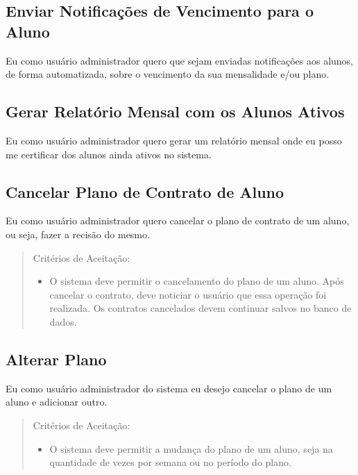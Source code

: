 \subsection[Enviar Notificações de Vencimento para o Aluno]{Enviar Notificações de Vencimento para o Aluno}
Eu como usuário administrador quero que sejam enviadas notificações aos alunos,
de forma automatizada, sobre o vencimento da sua mensalidade e/ou plano.

\subsection[Gerar Relatório Mensal com os Alunos Ativos]{Gerar Relatório Mensal com os Alunos Ativos}
Eu como usuário administrador quero gerar um relatório mensal onde eu posso me
certificar dos alunos ainda ativos no sistema.

\subsection[Cancelar Plano de Contrato de Aluno]{Cancelar Plano de Contrato de Aluno}
Eu como usuário administrador quero cancelar o plano de contrato de um aluno,
 ou seja, fazer a recisão do mesmo.

\begin{quote}
Critérios de Aceitação:
    \begin{itemize}
        \item O sistema deve permitir o cancelamento do plano de um aluno. Após cancelar o contrato, deve noticiar o usuário que essa operação foi realizada. Os contratos cancelados devem continuar salvos no banco de dados.
    \end{itemize}
\end{quote} 

\subsection[Alterar Plano]{Alterar Plano}
Eu como usuário administrador do sistema eu desejo cancelar o plano de um aluno e adicionar outro.

\begin{quote}
Critérios de Aceitação:
    \begin{itemize}
        \item O sistema deve permitir a mudança do plano de um aluno, seja na quantidade de vezes por semana ou no período do plano.
    \end{itemize}
\end{quote} 


